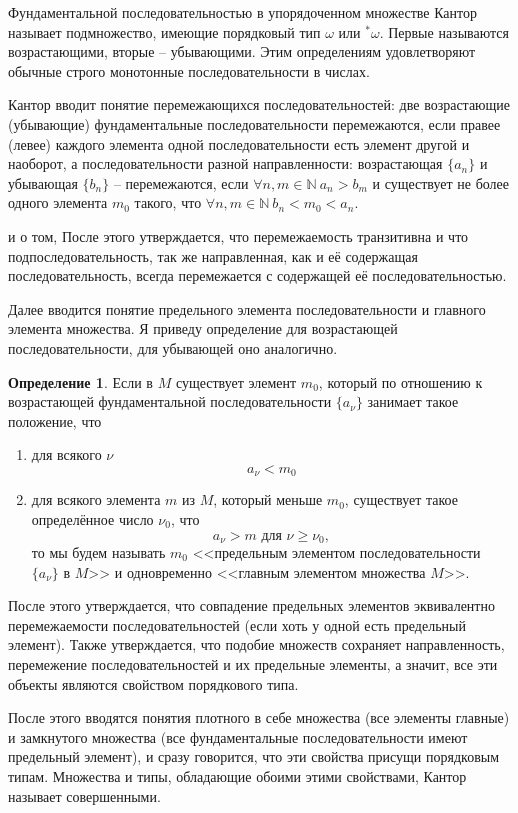 \documentclass[a4paper,12pt]{extarticle}
\theoremstyle{definition}
\newtheorem{definition}{Определение}
\begin{document}
Фундаментальной последовательностью в упорядоченном множестве Кантор называет подмножество, имеющие порядковый тип $\omega$ или $^*\omega$.
Первые называются возрастающими, вторые -- убывающими.
Этим определениям удовлетворяют обычные строго монотонные последовательности в числах.

Кантор вводит понятие перемежающихся последовательностей: две возрастающие (убывающие) фундаментальные последовательности перемежаются,
если правее (левее) каждого элемента одной последовательности есть элемент другой и наоборот,
а последовательности разной направленности: возрастающая $\{a_n\}$ и убывающая $\{b_n\}$ -- перемежаются,
если $\forall n, m \in \mathbb{N}~a_n > b_m$ и существует не более одного элемента $m_0$ такого, что $\forall n, m \in \mathbb{N}~b_n < m_0 < a_n$.

и о том, После этого утверждается, что перемежаемость транзитивна и что подпоследовательность, так же направленная, как и её содержащая последовательность,
всегда перемежается с содержащей её последовательностью.

Далее вводится понятие предельного элемента последовательности и главного элемента множества.
Я приведу определение для возрастающей последовательности, для убывающей оно аналогично.
\begin{definition}
    Если в $M$ существует элемент $m_0$, который по отношению к возрастающей фундаментальной последовательности $\{a_{\nu}\}$ занимает такое положение, что 
    \begin{enumerate}
        \item для всякого $\nu$ $$a_{\nu} < m_0$$
        \item для всякого элемента $m$ из $M$, который меньше $m_0$, существует такое определённое число $\nu_0$, что
            $$ a_{\nu} > m \text{ для } \nu \geqslant \nu_0,$$
            то мы будем называть $m_0$ <<предельным элементом последовательности $\{a_{\nu}\}$ в $M$>> и одновременно <<главным элементом множества $M$>>.
    \end{enumerate}
\end{definition}

После этого утверждается, что совпадение предельных элементов эквивалентно перемежаемости последовательностей (если хоть у одной есть предельный элемент).
Также утверждается, что подобие множеств сохраняет направленность, перемежение последовательностей и их предельные элементы, а значит, все эти объекты являются свойством порядкового типа.

После этого вводятся понятия плотного в себе множества (все элементы главные) и замкнутого множества (все фундаментальные последовательности имеют предельный элемент),
и сразу говорится, что эти свойства присущи порядковым типам.
Множества и типы, обладающие обоими этими свойствами, Кантор называет совершенными.
\end{document}
